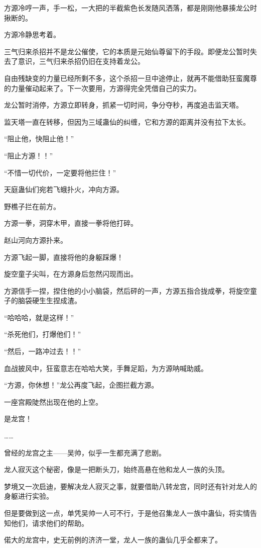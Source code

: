 \begin{this_body}
方源冷哼一声，手一松，一大把的半截紫色长发随风洒落，都是刚刚他暴揍龙公时揪断的。

方源冷静思考着。

三气归来杀招并不是龙公催使，它的本质是元始仙尊留下的手段。即便龙公暂时失去了意识，三气归来杀招仍旧在支持着龙公。

自由残缺变的力量已经所剩不多，这个杀招一旦中途停止，就再不能借助狂蛮魔尊的力量催动起来了。下一次要用，方源得完全凭借自己的实力。

龙公暂时消停，方源立即转身，抓紧一切时间，争分夺秒，再度追击监天塔。

监天塔一直在转移，但因为三域蛊仙的纠缠，它和方源的距离并没有拉下太长。

“阻止他，快阻止他！”

“阻止方源！！”

“不惜一切代价，一定要将他拦住！”

天庭蛊仙们宛若飞蛾扑火，冲向方源。

野樵子拦在前方。

方源一拳，洞穿木甲，直接一拳将他打碎。

赵山河向方源扑来。

方源飞起一脚，直接将他的身躯踩爆！

旋空童子尖叫，在方源身后忽然闪现而出。

方源信手一捏，捏住他的小小脑袋，然后砰的一声，方源五指合拢成拳，将旋空童子的脑袋硬生生捏成渣。

“哈哈哈，就是这样！”

“杀死他们，打爆他们！”

“然后，一路冲过去！！”

血战披风中，狂蛮意志在哈哈大笑，手舞足蹈，为方源呐喊助威。

“方源，你休想！”龙公再度飞起，企图拦截方源。

一座宫殿陡然出现在他的上空。

是龙宫！

……

曾经的龙宫之主——吴帅，似乎一生都充满了悲剧。

龙人寂灭这个秘密，像是一把断头刀，始终高悬在他和龙人一族的头顶。

梦境又一次启迪，要解决龙人寂灭之事，就要借助八转龙宫，同时还有针对龙人的身躯进行实验。

但是要做到这一点，单凭吴帅一人可不行，于是他召集龙人一族中蛊仙，将实情告知他们，请求他们的帮助。

偌大的龙宫中，史无前例的济济一堂，龙人一族的蛊仙几乎全都来了。


\end{this_body}
